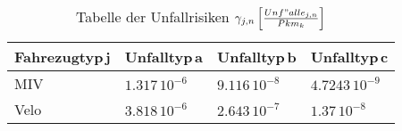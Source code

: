 %
%
%
%

\begin{table}[hbt!]
\center
%
%
\begin{tabular}{@{}p{2.6cm} p{3.3cm} p{3.3cm} p{3.3cm}@{}} \\   
\toprule
\textbf{Fahrezugtyp\,j} & \textbf{Unfalltyp\,a} & \textbf{Unfalltyp\,b} & \textbf{Unfalltyp\,c} \\
\midrule
MIV      & \(1.317\,\mathrm{10^{-6}}\)  & \(9.116\,\mathrm{10^{-8}}\)  & \(4.7243\,\mathrm{10^{-9}}\)  \\
Velo	 & \(3.818\,\mathrm{10^{-6}}\)  & \(2.643\,\mathrm{10^{-7}}\)  & \(1.37\,\mathrm{10^{-8}}\)   \\

\bottomrule

\end{tabular}
\caption[Tabelle der Unfallrisiken]{Tabelle der Unfallrisiken $\gamma_{j,n}\,\Bigl[\frac{Unf"alle_{j,n}}{Pkm_{k}}\Bigl]$}
\label{tab:t-06-01-Unfallrisiko}
\end{table}


%


